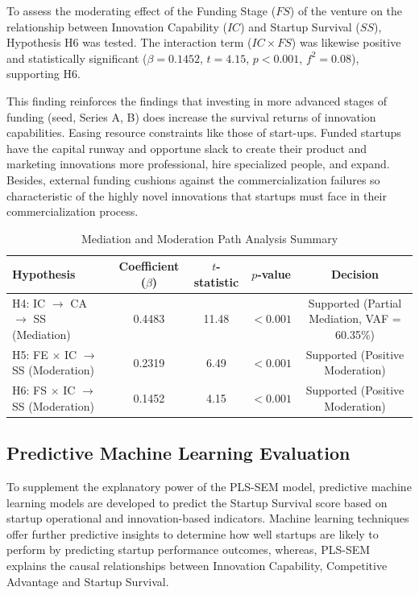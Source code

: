 \documentclass{ieeeaccess}
\begin{document}
To assess the moderating effect of the Funding Stage ($FS$) of the venture on the relationship between Innovation Capability ($IC$) and Startup Survival ($SS$), Hypothesis H6 was tested. The interaction term ($IC \times FS$) was likewise positive and statistically significant ($\beta = 0.1452$, $t = 4.15$, $p < 0.001$, $f^2 = 0.08$), supporting H6.

This finding reinforces the findings that investing in more advanced stages of funding (seed, Series A, B) does increase the survival returns of innovation capabilities. Easing resource constraints like those of start-ups. Funded startups have the capital runway and opportune slack to create their product and marketing innovations more professional, hire specialized people, and expand. Besides, external funding cushions against the commercialization failures so characteristic of the highly novel innovations that startups must face in their commercialization process.

\begin{table}[htbp]
\caption{Mediation and Moderation Path Analysis Summary}
\label{tab:mediation_moderation}
\centering
\begin{tabular}{lcccc}
\hline
\textbf{Hypothesis} &
\textbf{Coefficient ($\beta$)} &
\textbf{$t$-statistic} &
\textbf{$p$-value} &
\textbf{Decision} \\
\hline

H4: IC $\rightarrow$ CA $\rightarrow$ SS (Mediation)
& 0.4483
& 11.48
& $< 0.001$
& Supported (Partial Mediation, VAF = 60.35\%) \\

H5: FE $\times$ IC $\rightarrow$ SS (Moderation)
& 0.2319
& 6.49
& $< 0.001$
& Supported (Positive Moderation) \\

H6: FS $\times$ IC $\rightarrow$ SS (Moderation)
& 0.1452
& 4.15
& $< 0.001$
& Supported (Positive Moderation) \\
\hline
\end{tabular}
\end{table}


\subsection{Predictive Machine Learning Evaluation}

To supplement the explanatory power of the PLS-SEM model, predictive machine learning models are developed to predict the Startup Survival score based on startup operational and innovation-based indicators. Machine learning techniques offer further predictive insights to determine how well startups are likely to perform by predicting startup performance outcomes, whereas, PLS-SEM explains the causal relationships between Innovation Capability, Competitive Advantage and Startup Survival.
\end{document}
